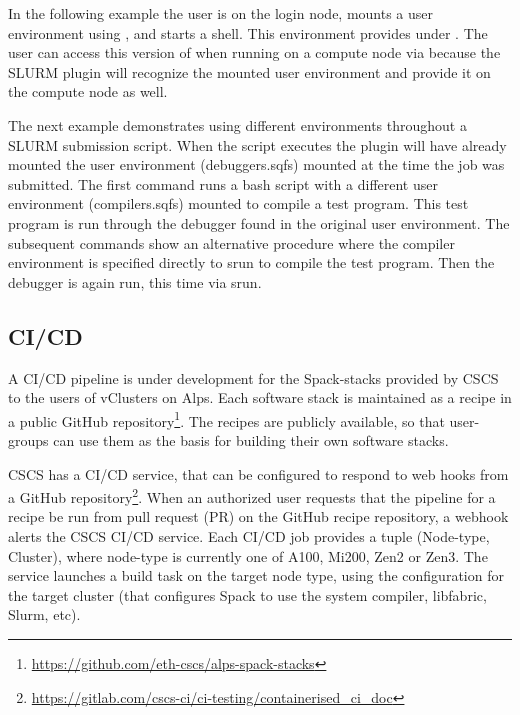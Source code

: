 In the following example the user is on the login node, mounts a user environment using , and starts a  shell. 
This environment provides  under .
The user can access this version of  when running on a compute node via  because the SLURM plugin will recognize the mounted user environment and provide it on the compute node as well.



The next example demonstrates using different environments throughout a SLURM submission script.
When the script executes the plugin will have already mounted the user environment (debuggers.sqfs) mounted at the time the job was submitted.
The first command runs a bash script with a different user environment (compilers.sqfs) mounted to compile a test program.
This test program is run through the debugger found in the original user environment.
The subsequent commands show an alternative procedure where the compiler environment is specified directly to srun to compile the test program.
Then the debugger is again run, this time via srun.



\subsection{CI/CD}

A CI/CD pipeline is under development for the Spack-stacks provided by CSCS to the users of vClusters on Alps.
Each software stack is maintained as a \stackinator recipe in a public GitHub repository\footnote{\url{https://github.com/eth-cscs/alps-spack-stacks}}.
The recipes are publicly available, so that user-groups can use them as the basis for building their own software stacks.

CSCS has a CI/CD service, that can be configured to respond to web hooks from a GitHub repository\footnote{\url{https://gitlab.com/cscs-ci/ci-testing/containerised_ci_doc}}.
When an authorized user requests that the pipeline for a recipe be run from pull request (PR) on the GitHub recipe repository, a webhook alerts the CSCS CI/CD service.
Each CI/CD job provides a tuple {\sf (Node-type, Cluster)}, where node-type is currently one of A100, Mi200, Zen2 or Zen3.
The service launches a build task on the target node type, using the configuration for the target cluster (that configures Spack to use the system compiler, libfabric, Slurm, etc).


